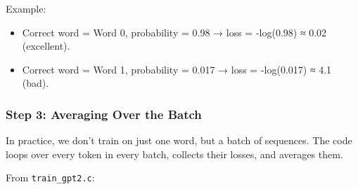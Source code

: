 \documentclass[
  letterpaper,
  DIV=11,
  numbers=noendperiod]{scrreprt}
\providecommand{\tightlist}{%
  \setlength{\itemsep}{0pt}\setlength{\parskip}{0pt}}
\begin{document}
Example:

\begin{itemize}
\tightlist
\item
  Correct word = Word 0, probability = 0.98 → loss = -log(0.98) ≈ 0.02
  (excellent).
\item
  Correct word = Word 1, probability = 0.017 → loss = -log(0.017) ≈ 4.1
  (bad).
\end{itemize}

\subsubsection{Step 3: Averaging Over the
Batch}\label{step-3-averaging-over-the-batch}

In practice, we don't train on just one word, but a batch of sequences.
The code loops over every token in every batch, collects their losses,
and averages them.

From \texttt{train\_gpt2.c}:
\end{document}
